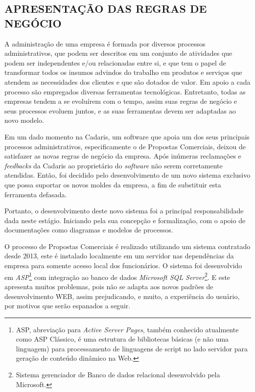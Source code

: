 \documentclass[
  12pt,				%
  openany,
  oneside,
  a4paper,			%
  english,			%
  brazil
]{article}
\numberwithin{figure}{section}
\numberwithin{table}{section}
\begin{document}
\subsection{APRESENTAÇÃO DAS REGRAS DE NEGÓCIO}
\label{sec:2.1}

A administração de uma empresa é formada por diversos processos administrativos, que podem ser descritos em um conjunto de atividades que podem ser independentes e/ou relacionadas entre si, e que tem o papel de transformar todos os insumos advindos do trabalho em produtos e serviços que atendem as necessidades dos clientes e que são dotados de valor. Em apoio a cada processo são empregados diversas ferramentas tecnológicas. Entretanto, todas as empresas tendem a se evoluírem com o tempo, assim suas regras de negócio e seus processos evoluem juntos, e as suas ferramentas devem ser adaptadas ao novo modelo.

Em um dado momento na Cadaris, um software que apoia um dos seus principais processos administrativos, especificamente o de Propostas Comerciais, deixou de satisfazer as novas regras de negócio da empresa. Após inúmeras reclamações e \textit{feedbacks} da Cadaris ao proprietário do \textit{software} não serem corretamente atendidas. Então, foi decidido pelo desenvolvimento de um novo sistema exclusivo que possa suportar os novos moldes da empresa, a fim de substituir esta ferramenta defasada.

Portanto, o desenvolvimento deste novo sistema foi a principal responsabilidade dada neste estágio. Iniciando pela sua concepção e formalização, com o apoio de documentações como diagramas e modelos de processos.

O processo de Propostas Comerciais é realizado utilizando um sistema contratado desde 2013, este é instalado localmente em um servidor nas dependências da empresa para somente acesso local dos funcionários. O sistema foi desenvolvido em \textit{ASP}\footnote{ASP, abreviação para \textit{Active Server Pages}, também conhecido atualmente como ASP Clássico, é uma estrutura de bibliotecas básicas (e não uma linguagem) para processamento de linguagens de script no lado servidor para geração de conteúdo dinâmico na Web.} com integração ao banco de dados \textit{Microsoft SQL Server}\footnote{Sistema gerenciador de Banco de dados relacional desenvolvido pela Microsoft.}. E este apresenta muitos problemas, pois não se adapta aos novos padrões de desenvolvimento WEB, assim prejudicando, e muito, a experiência do usuário, por motivos que serão espanados a seguir.
\end{document}
